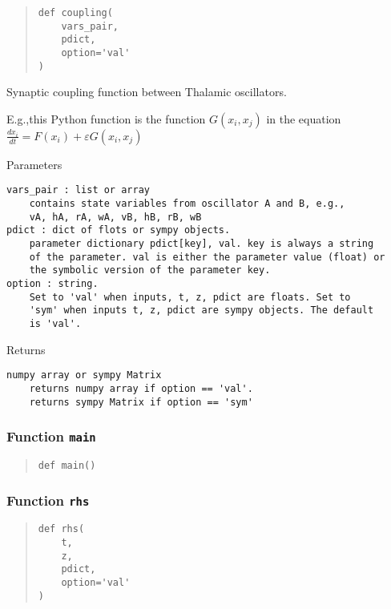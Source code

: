 \documentclass[english,a4paper,oneside]{article}
\begin{document}
\begin{quote}
\begin{verbatim}
def coupling(
    vars_pair,
    pdict,
    option='val'
)
\end{verbatim}
\end{quote}

Synaptic coupling function between Thalamic oscillators.

E.g.,this Python function is the function \(G(x_i,x_j)\) in the equation
\(\frac{dx_i}{dt} = F(x_i) + \varepsilon G(x_i,x_j)\)

Parameters

\begin{verbatim}
vars_pair : list or array
    contains state variables from oscillator A and B, e.g.,
    vA, hA, rA, wA, vB, hB, rB, wB  
pdict : dict of flots or sympy objects.
    parameter dictionary pdict[key], val. key is always a string
    of the parameter. val is either the parameter value (float) or 
    the symbolic version of the parameter key.
option : string.
    Set to 'val' when inputs, t, z, pdict are floats. Set to
    'sym' when inputs t, z, pdict are sympy objects. The default
    is 'val'.
\end{verbatim}

Returns

\begin{verbatim}
numpy array or sympy Matrix
    returns numpy array if option == 'val'. 
    returns sympy Matrix if option == 'sym'
\end{verbatim}

\hypertarget{Thalamic.main}{%
\subsubsection{\texorpdfstring{Function
\texttt{main}}{Function main}}\label{Thalamic.main}}

\begin{quote}
\begin{verbatim}
def main()
\end{verbatim}
\end{quote}

\hypertarget{Thalamic.rhs}{%
\subsubsection{\texorpdfstring{Function
\texttt{rhs}}{Function rhs}}\label{Thalamic.rhs}}

\begin{quote}
\begin{verbatim}
def rhs(
    t,
    z,
    pdict,
    option='val'
)
\end{verbatim}
\end{quote}
\end{document}
